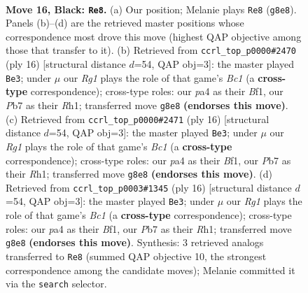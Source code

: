 \documentclass[11pt]{article}
\begin{document}
\clearpage

\begin{figure}[p]\centering
\begin{subfigure}{0.46\textwidth}\centering
\resizebox{\linewidth}{!}{%
\newchessgame
\chessboard[
  setfen={rnb3r1/1p3ppp/1k2pn2/pNb5/P6P/1B2P3/1P1B1PP1/RN3RK1 b - - 10 16},
  showmover=false,
  pgfstyle=straightmove, color=movearrow, markmove={g8-e8}
]}
\caption{}
\end{subfigure}\hfill
\begin{subfigure}{0.46\textwidth}\centering
\resizebox{\linewidth}{!}{%
\newchessgame
\chessboard[
  setfen={rnbr2k1/ppp2pbp/5np1/4p3/2P1P3/2N2N1P/PP3PP1/R1B1KB1R w KQ - 0 9},
  showmover=false,
  pgfstyle=straightmove, color=movearrow, markmove={c1-e3}
]}
\caption{}
\end{subfigure}
\\[4pt]
\begin{subfigure}{0.46\textwidth}\centering
\resizebox{\linewidth}{!}{%
\newchessgame
\chessboard[
  setfen={rnbr2k1/ppp2pbp/5np1/4p3/2P1P3/2N2N1P/PP3PP1/R1B1KB1R w KQ - 0 9},
  showmover=false,
  pgfstyle=straightmove, color=movearrow, markmove={c1-e3}
]}
\caption{}
\end{subfigure}\hfill
\begin{subfigure}{0.46\textwidth}\centering
\resizebox{\linewidth}{!}{%
\newchessgame
\chessboard[
  setfen={rnbr2k1/ppp2pbp/5np1/4p3/2P1P3/2N2N1P/PP3PP1/R1B1KB1R w KQ - 0 9},
  showmover=false,
  pgfstyle=straightmove, color=movearrow, markmove={c1-e3}
]}
\caption{}
\end{subfigure}
\caption{\textbf{Move 16, Black: \texttt{Re8}.} (a) Our position; Melanie plays \texttt{Re8} (\texttt{g8e8}). Panels (b)--(d) are the retrieved master positions whose correspondence most drove this move (highest QAP objective among those that transfer to it). (b) Retrieved from \texttt{ccrl\_top\_p0000\#2470} (ply 16) [structural distance $d$=54, QAP obj=3]: the master played \texttt{Be3}; under $\mu$ our \emph{Rg1} plays the role of that game's \emph{Bc1} (a \textbf{cross-type} correspondence); cross-type roles: our \emph{p}a4 as their \emph{B}f1, our \emph{P}b7 as their \emph{R}h1; transferred move \texttt{g8e8} \textbf{(endorses this move)}. (c) Retrieved from \texttt{ccrl\_top\_p0000\#2471} (ply 16) [structural distance $d$=54, QAP obj=3]: the master played \texttt{Be3}; under $\mu$ our \emph{Rg1} plays the role of that game's \emph{Bc1} (a \textbf{cross-type} correspondence); cross-type roles: our \emph{p}a4 as their \emph{B}f1, our \emph{P}b7 as their \emph{R}h1; transferred move \texttt{g8e8} \textbf{(endorses this move)}. (d) Retrieved from \texttt{ccrl\_top\_p0003\#1345} (ply 16) [structural distance $d$=54, QAP obj=3]: the master played \texttt{Be3}; under $\mu$ our \emph{Rg1} plays the role of that game's \emph{Bc1} (a \textbf{cross-type} correspondence); cross-type roles: our \emph{p}a4 as their \emph{B}f1, our \emph{P}b7 as their \emph{R}h1; transferred move \texttt{g8e8} \textbf{(endorses this move)}. Synthesis: 3 retrieved analogs transferred to \texttt{Re8} (summed QAP objective 10, the strongest correspondence among the candidate moves); Melanie committed it via the \texttt{search} selector.}
\label{fig:thought-m31}
\end{figure}
\end{document}
